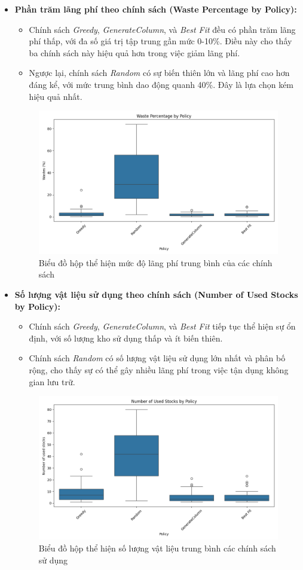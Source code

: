 \begin{itemize}
    \item \textbf{Phần trăm lãng phí theo chính sách (Waste Percentage by Policy):} 
    \begin{itemize}
        \item Chính sách \textit{Greedy}, \textit{GenerateColumn}, và \textit{Best Fit} đều có phần trăm lãng phí thấp, với đa số giá trị tập trung gần mức 0-10\%. Điều này cho thấy ba chính sách này hiệu quả hơn trong việc giảm lãng phí.
        \item Ngược lại, chính sách \textit{Random} có sự biến thiên lớn và lãng phí cao hơn đáng kể, với mức trung bình dao động quanh 40\%. Đây là lựa chọn kém hiệu quả nhất.
    \end{itemize}

    \begin{figure}[!htp]
        \centering
        \includegraphics[width=0.5\linewidth]{Images/waste_comparison.png}
        \caption{Biểu đồ hộp thể hiện mức độ lãng phí trung bình của các chính sách}
        \label{fig:trimloss}
    \end{figure}
    
    \item \textbf{Số lượng vật liệu sử dụng theo chính sách (Number of Used Stocks by Policy):}
    \begin{itemize}
        \item Chính sách \textit{Greedy}, \textit{GenerateColumn}, và \textit{Best Fit} tiếp tục thể hiện sự ổn định, với số lượng kho sử dụng thấp và ít biến thiên.
        \item Chính sách \textit{Random} có số lượng vật liệu sử dụng lớn nhất và phân bố rộng, cho thấy sự có thể gây nhiều lãng phí trong việc tận dụng không gian lưu trữ.
    \end{itemize}
    \begin{figure}[!htp]
        \centering
        \includegraphics[width=0.5\linewidth]{Images/stocks_comparison.png}
        \caption{Biểu đồ hộp thể hiện số lượng vật liệu trung bình các chính sách sử dụng}
        \label{fig:stocks}
    \end{figure}
    

\end{itemize}

